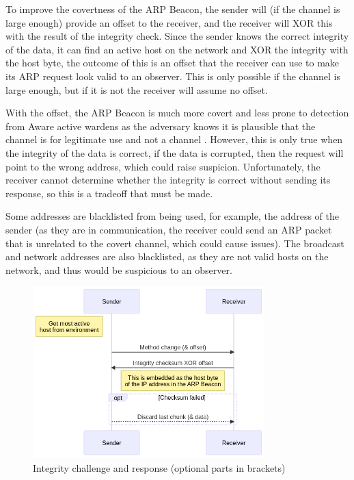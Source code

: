 To improve the covertness of the ARP Beacon, the sender will (if the channel is large enough) provide an offset to the receiver, and the receiver will XOR this with the result of the integrity check. Since the sender knows the correct integrity of the data, it can find an active host on the network and XOR the integrity with the host byte, the outcome of this is an offset that the receiver can use to make its ARP request look valid to an observer. This is only possible if the channel is large enough, but if it is not the receiver will assume no offset.

With the offset, the ARP Beacon is much more covert and less prone to detection from Aware active wardens as the adversary knows it is plausible that the channel is for legitimate use and not a channel \cite{GUCCA}. However, this is only true when the integrity of the data is correct, if the data is corrupted, then the request will point to the wrong address, which could raise suspicion. Unfortunately, the receiver cannot determine whether the integrity is correct without sending its response, so this is a tradeoff that must be made.

Some addresses are blacklisted from being used, for example, the address of the sender (as they are in communication, the receiver could send an ARP packet that is unrelated to the covert channel, which could cause issues). The broadcast and network addresses are also blacklisted, as they are not valid hosts on the network, and thus would be suspicious to an observer. 

\begin{figure}[h]
    \centering
    \includegraphics[width=0.8\textwidth]{fig/Integrity.png}
    \caption{Integrity challenge and response (optional parts in brackets)}
    \label{fig:integrity}
\end{figure}


